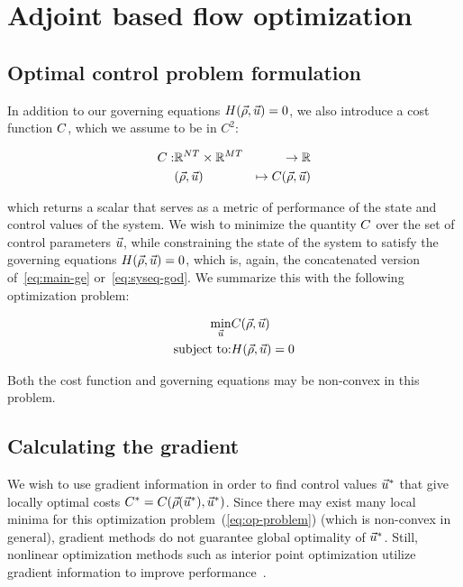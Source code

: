 
\section{Adjoint based flow optimization\label{sec:Adjoint-method}}


\subsection{Optimal control problem formulation\label{par:Optimization-Problem}}

In addition to our governing equations $\sys\left(\state,\control\right)=0$,
we also introduce a cost function $C$, which we assume to be
in $C^{2}$:

\begin{eqnarray*}
\cost: & \mathbb{R}^{\nlinks T}\times\mathbb{R}^{\ncontrols T} & \rightarrow\mathbb{R}\\
 & \left(\state,\control\right) & \mapsto\cost\left(\state,\control\right)
\end{eqnarray*}


which returns a scalar that serves as a metric of performance of the
state and control values of the system. We wish to minimize the quantity
$C$ over the set of control parameters $\vec{u}$, while constraining
the state of the system to satisfy the governing equations $\sys\left(\state,\control\right)=0$,
which is, again, the concatenated version of~\ref{eq:main-ge} or~\ref{eq:syseq-god}.
We summarize this with the following optimization problem:

\begin{eqnarray}
\underset{\control}{\min} & \cost\left(\state,\control\right)\nonumber \\
\text{subject to:} & \sys\left(\state,\control\right)=0\label{eq:op-problem}
\end{eqnarray}


Both the cost function and governing equations may be non-convex in
this problem.


\subsection{Calculating the gradient\label{par:Calculating-the-gradient}}

We wish to use gradient information in order to find control values
$\vec{u}^{*}$ that give locally optimal costs $\cost^{*}=\cost\left(\state\left(\control^{*}\right),\control^{*}\right)$.
Since there may exist many local minima for this optimization problem~(\ref{eq:op-problem})
(which is non-convex in general), gradient\emph{ }methods do not guarantee
global optimality of $\vec{u}^{*}$\emph{. }Still, nonlinear optimization
methods such as interior point optimization utilize gradient information
to improve performance~\cite{Andreas2005}.

